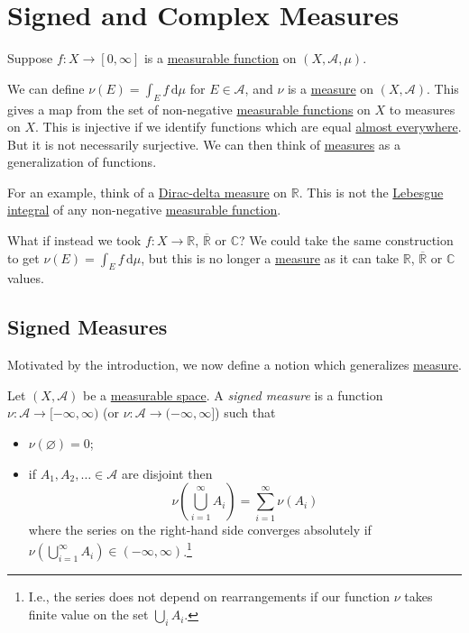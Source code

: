\chapter{Signed and Complex Measures}\label{ch:Signed-and-Complex-Measures}
\begin{prev}
	Suppose \(f \colon X \to [0,\infty]\) is a \hyperref[def:measurable-function]{measurable function} on \((X, \mathcal{A}, \mu)\).

	We can define \(\nu(E) = \int_E f \,\mathrm{d} \mu\)  for \(E \in \mathcal{A}\), and \(\nu\) is a \hyperref[def:measure]{measure} on \((X, \mathcal{A})\). This gives a map from the set of non-negative \hyperref[def:measurable-function]{measurable functions} on \(X\) to measures on \(X\). This is injective if we identify functions which are equal \hyperref[def:mu-almost-everywhere]{almost everywhere}. But it is not necessarily surjective. We can then think of \hyperref[def:measure]{measures} as a generalization of functions.

	For an example, think of a \hyperref[eg:Dirac-delta-measure]{Dirac-delta measure} on \(\mathbb{R}\). This is not the \hyperref[def:integrable]{Lebesgue integral} of any non-negative \hyperref[def:measurable-function]{measurable function}.
\end{prev}

What if instead we took \(f \colon X \to \mathbb{R}\), \(\overline{\mathbb{R}}\) or \(\mathbb{C}\)? We could take the same construction to get \(\nu(E) = \int_E f \,\mathrm{d} \mu\), but this is no longer a \hyperref[def:measure]{measure} as it can take \(\mathbb{R}\), \(\overline{\mathbb{R}}\) or \(\mathbb{C}\) values.

\section{Signed Measures}
Motivated by the introduction, we now define a notion which generalizes \hyperref[def:measure]{measure}.

\begin{definition}\label{def:signed-measure}
	Let \((X, \mathcal{A})\) be a \hyperref[def:measurable-space]{measurable space}. A \emph{signed measure} is a function \(\nu \colon \mathcal{A} \to [-\infty,\infty)\) (or \(\nu \colon \mathcal{A} \to  (-\infty, \infty]\)) such that
	\begin{itemize}
		\item \(\nu(\varnothing ) = 0\);
		\item if \(A_1,A_2,\dots \in \mathcal{A}\) are disjoint then
		      \[
			      \nu\left( \bigcup_{i=1}^\infty A_i \right) = \sum_{i=1}^\infty \nu(A_i)
		      \]
		      where the series on the right-hand side converges absolutely if \(\nu\left( \bigcup_{i=1}^\infty A_{i} \right) \in (-\infty,\infty)\).\footnote{I.e., the series does not depend on rearrangements if our function \(\nu \) takes finite value on the set \(\bigcup_i A_{i} \).}
	\end{itemize}
\end{definition}

